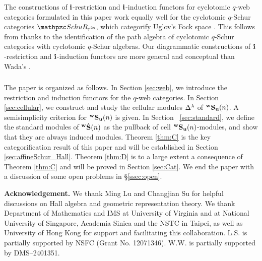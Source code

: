 The constructions of $\mathbf{i}$-restriction and $\mathbf{i}$-induction functors for cyclotomic $q$-web categories formulated in this paper work equally well for the cyclotomic $q$-Schur categories $\qSch_{\eps^{2\bfs}}$, which categorify Uglov's Fock space \cite{Ugl00}. This follows from 
\cite{RSVV} thanks to the identification of the path algebra of cyclotomic $q$-Schur categories with cyclotomic $q$-Schur algebras. Our diagrammatic constructions of $\mathbf{i}$-restriction and $\mathbf{i}$-induction functors are more general and conceptual than Wada's \cite{Wad14}.


\subsubsection{}
The paper is organized as follows. In Section \ref{sec:web}, we introduce the restriction and induction functors for the $q$-web categories. In Section \ref{sec:cellular}, we construct and study the cellular modules $\Delta^\lambda$ of ${}^{\bold{w}}\bold{S}_{\mathbf{u}}(n)$. A semisimplicity criterion for ${}^{\bold{w}}\bold{S}_{\mathbf{u}}(n)$ is given. In Section~ \ref{sec:standard}, we define the standard modules of ${}^{\bold{w}}\dot{\bold{S}}(n)$ as the pullback of cell ${}^{\bold{w}}\bold{S}_{\mathbf{u}}(n)$-modules, and show that they are always induced modules. Theorem \ref{thm:C} is the key categorification result of this paper and will be established in Section \ref{sec:affineSchur_Hall}. Theorem \ref{thm:D} is to a large extent a consequence of Theorem \ref{thm:C} and will be proved in Section \ref{sec:Cat}. We end the paper with a discussion of some open problems in \S\ref{ssec:open}. 


\vspace{2mm}
%
{\bf Acknowledgement.} 
We thank Ming Lu and Changjian Su for helpful discussions on Hall algebra and geometric representation theory. We thank Department of Mathematics and IMS at University of Virginia and at National University of Singapore, Academia Sinica and the NSTC in Taipei, as well as University of Hong Kong for support and facilitating this collaboration. L.S. is partially supported by NSFC (Grant No. 12071346). W.W. is partially supported by DMS--2401351. 

